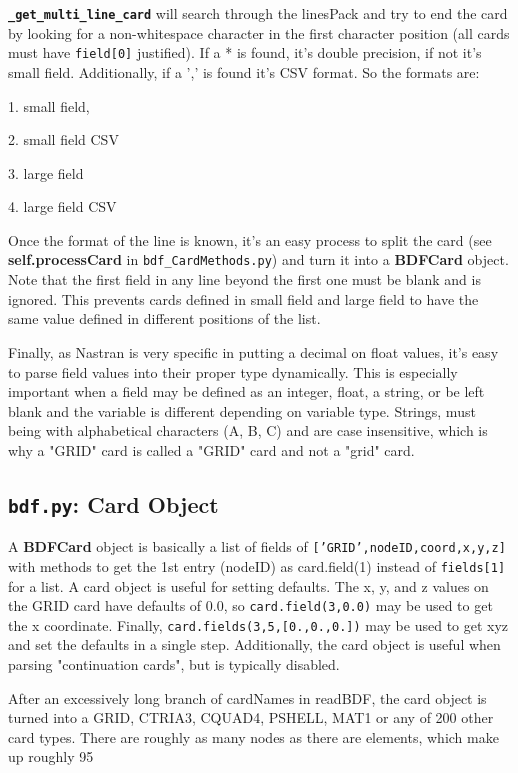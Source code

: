      {\bf \tt \_get\_multi\_line\_card} will search through the linesPack and try to end the card by looking for a non-whitespace character in the first character position (all cards must have {\tt field[0]} justified).  If a * is found, it's double precision, if not it's small field.  Additionally, if a ',' is found it's CSV format.  So the formats are:

       1. small field,

       2. small field CSV

       3. large field

       4. large field CSV
     
     Once the format of the line is known, it's an easy process to split the card (see {\bf self.processCard} in {\tt bdf\_CardMethods.py}) and turn it into a {\bf BDFCard} object.  Note that the first field in any line beyond the first one must be blank and is ignored.  This prevents cards defined in small field and large field to have the same value defined in different positions of the list.
     
     Finally, as Nastran is very specific in putting a decimal on float values, it's easy to parse field values into their proper type dynamically.  This is especially important when a field may be defined as an integer, float, a string, or be left blank and the variable is different depending on variable type.  Strings, must being with alphabetical characters (A, B, C) and are case insensitive, which is why a "GRID" card is called a "GRID" card and not a "grid" card.
     
     
 \subsection{{\tt bdf.py}: Card Object}
     A {\bf BDFCard} object is basically a list of fields of {\tt ['GRID',nodeID,coord,x,y,z]}  with methods to get the 1st entry (nodeID) as card.field(1) instead of {\tt fields[1]} for a list.  A card object is useful for setting defaults.  The x, y, and z values on the GRID card have defaults of 0.0, so {\tt card.field(3,0.0)} may be used to get the x coordinate. Finally, {\tt card.fields(3,5,[0.,0.,0.])} may be used to get xyz and set the defaults in a single step.  Additionally, the card object is useful when parsing "continuation cards", but is typically disabled.  
     
     After an excessively long branch of cardNames in readBDF, the card object is turned into a GRID, CTRIA3, CQUAD4, PSHELL, MAT1 or any of 200 other card types.  There are roughly as many nodes as there are elements, which make up roughly 95%
   

